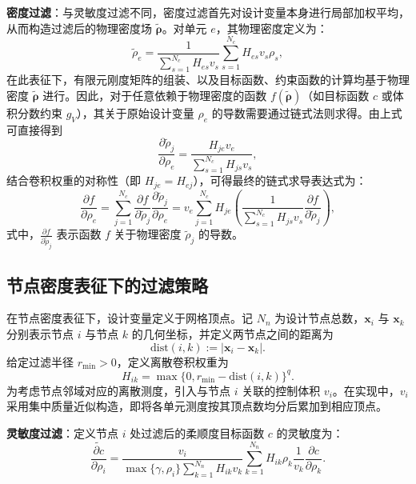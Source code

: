 \textbf{密度过滤}：与灵敏度过滤不同，密度过滤首先对设计变量本身进行局部加权平均，从而构造过滤后的物理密度场 $\tilde{\boldsymbol{\rho}}$。对单元 $e$，其物理密度定义为：
\begin{equation} \label{eq:ch3_cell_dens_filter}
	\tilde{\rho}_e = \frac{1}{\sum_{s=1}^{N_c} H_{es}v_s}\sum_{s=1}^{N_c} H_{es}v_s \rho_s,
\end{equation}
在此表征下，有限元刚度矩阵的组装、以及目标函数、约束函数的计算均基于物理密度 $\tilde{\boldsymbol{\rho}}$ 进行。因此，对于任意依赖于物理密度的函数 $f(\tilde{\boldsymbol{\rho}})$（如目标函数 $c$ 或体积分数约束 $g_V$），其关于原始设计变量 $\rho_e$ 的导数需要通过链式法则求得。由上式可直接得到
\[
\frac{\partial \tilde{\rho}_j}{\partial \rho_e} = \frac{H_{je} v_e}{\sum_{s=1}^{N_c} H_{js} v_s},
\]
结合卷积权重的对称性（即 $H_{je} = H_{ej}$），可得最终的链式求导表达式为：
\begin{equation} \label{eq:ch3_cell_chain_rule}
	\frac{\partial{f}}{\partial\rho_e} = \sum_{j=1}^{N_c} \frac{\partial{f}}{\partial \tilde{\rho}_j} \frac{\partial \tilde{\rho}_j}{\partial \rho_e} = v_e\sum_{j=1}^{N_c}H_{je}\left( \frac{1}{\sum_{s=1}^{N_c} H_{js} v_s}\frac{\partial{f}}{\partial \tilde{\rho}_j}\right),
\end{equation}
式中，$\frac{\partial f}{\partial \tilde{\rho}_j}$ 表示函数 $f$ 关于物理密度 $\tilde{\rho}_j$ 的导数。


\subsection{节点密度表征下的过滤策略}
\label{subsec:node_density_regularization}

在节点密度表征下，设计变量定义于网格顶点。记 $N_n$ 为设计节点总数，$\boldsymbol{x}_i$ 与 $\boldsymbol{x}_k$ 分别表示节点 $i$ 与节点 $k$ 的几何坐标，并定义两节点之间的距离为
\[
\mathrm{dist}(i,k):=\vert \boldsymbol{x}_i-\boldsymbol{x}_k\vert.
\]
给定过滤半径 $r_{\min}>0$，定义离散卷积权重为
\[
H_{ik}=\max\{0,r_{\min}-\mathrm{dist}(i,k)\}^q.
\]
为考虑节点邻域对应的离散测度，引入与节点 $i$ 关联的控制体积 $v_i$。在实现中，$v_i$ 采用集中质量近似构造，即将各单元测度按其顶点数均分后累加到相应顶点。

\textbf{灵敏度过滤}：定义节点 $i$ 处过滤后的柔顺度目标函数 $c$ 的灵敏度为：
\begin{equation} \label{eq:ch3_node_sens_filter}
	\widetilde{\frac{\partial c}{\partial\rho_i}} = \frac{v_i}{\max\{\gamma,\rho_i\}\sum_{k=1}^{N_n}H_{ik}v_k} \sum_{k=1}^{N_n}H_{ik}\rho_k\frac{1}{v_k}\frac{\partial c}{\partial\rho_k}.
\end{equation}


